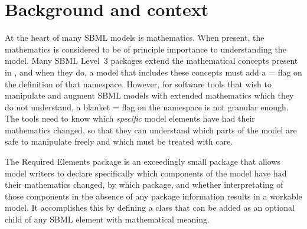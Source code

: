 
\section{Background and context}
\label{background}

At the heart of many SBML models is mathematics. When present, the mathematics is considered to be of principle importance to understanding the model. Many SBML Level~3 packages extend the mathematical concepts present in \sbmlthreecore, and when they do, a model that includes these concepts must add a = flag on the definition of that namespace.  However, for software tools that wish to manipulate and augment SBML models with extended mathematics which they do not understand, a blanket = flag on the namespace is not granular enough.  The tools need to know which \emph{specific} model elements have had their mathematics changed, so that they can understand which parts of the model are safe to manipulate freely and which must be treated with care.

The Required Elements package is an exceedingly small package that allows model writers to declare specifically which components of the model have had their mathematics changed, by which package, and whether interpretating of those components in the absence of any package information results in a workable model.  It accomplishes this by defining a class that can be added as an optional child of any SBML element with mathematical meaning.
